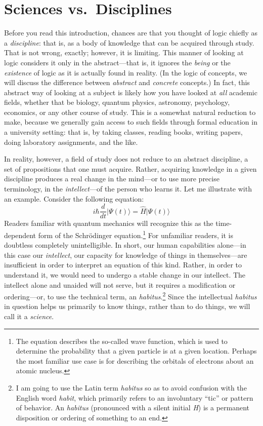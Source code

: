 \documentclass[article,12pt,a4paper,oneside]{memoir}
\begin{document}
    \hypertarget{sciences-vs.-disciplines}{%
    \section{Sciences vs.~Disciplines}\label{sciences-vs.-disciplines}}

    Before you read this introduction, chances are that you thought of
    logic chiefly as a \emph{discipline}: that is, as a body of
    knowledge that can be acquired through study. That is not wrong,
    exactly; however, it is limiting. This manner of looking at logic
    considers it only in the abstract---that is, it ignores the
    \emph{being} or the \emph{existence} of logic as it is actually
    found in reality. (In the logic of concepts, we will discuss the
    difference between \emph{abstract} and \emph{concrete} concepts.) In
    fact, this abstract way of looking at a subject is likely how you
    have looked at \emph{all} academic fields, whether that be biology,
    quantum physics, astronomy, psychology, economics, or any other
    course of study. This is a somewhat natural reduction to make,
    because we generally gain access to such fields through formal
    education in a university setting: that is, by taking classes,
    reading books, writing papers, doing laboratory assignments, and the
    like.

    In reality, however, a field of study does not reduce to an abstract
    discipline, a set of propositions that one must acquire. Rather,
    acquiring knowledge in a given discipline produces a real change in
    the mind---or to use more precise terminology, in the
    \emph{intellect}---of the person who learns it. Let me illustrate
    with an example. Consider the following equation:
    \[i \hbar \frac{d}{d t}\vert\Psi(t)\rangle = \hat H\vert\Psi(t)\rangle\]
    Readers familiar with quantum mechanics will recognize this as the
    time-dependent form of the Schrödinger equation.\footnote{The
      equation describes the so-called wave function, which is used to
      determine the probability that a given particle is at a given
      location. Perhaps the most familiar use case is for describing the
      orbitals of electrons about an atomic nucleus.} For unfamiliar
    readers, it is doubtless completely unintelligible. In short, our
    human capabilities alone---in this case our \emph{intellect}, our
    capacity for knowledge of things in themselves---are insufficient in
    order to interpret an equation of this kind. Rather, in order to
    understand it, we would need to undergo a stable change in our
    intellect. The intellect alone and unaided will not serve, but it
    requires a modification or ordering---or, to use the technical term,
    an \emph{habitus}.\footnote{I am going to use the Latin term
      \emph{habitus} so as to avoid confusion with the English word
      \emph{habit}, which primarily refers to an involuntary ``tic'' or
      pattern of behavior. An \emph{habitus} (pronounced with a silent
      initial \emph{H}) is a permanent disposition or ordering of
      something to an end.} Since the intellectual \emph{habitus} in
    question helps us primarily to know things, rather than to do
    things, we will call it a \emph{science}.
\end{document}
